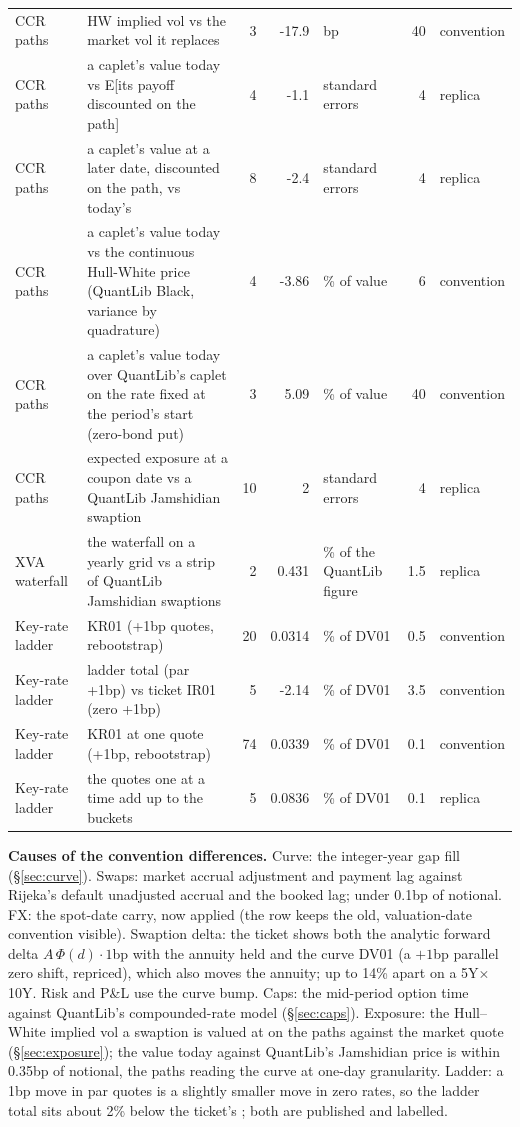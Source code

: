 \documentclass[11pt,a4paper]{article}
\newcommand{\code}[1]{\ifmmode\text{\small\texttt{\detokenize{#1}}}\else{\small\path{#1}}\fi}
\begin{document}
{\begin{longtable}{>{\raggedright\arraybackslash}p{2.2cm}>{\raggedright\arraybackslash}p{4.6cm} r r >{\raggedright\arraybackslash}p{1.8cm} r >{\raggedright\arraybackslash}p{1.8cm}}
CCR paths & HW implied vol vs the market vol it replaces & 3 & -17.9 & bp & 40 & convention \\
CCR paths & a caplet's value today vs E[its payoff discounted on the path] & 4 & -1.1 & standard errors & 4 & replica \\
CCR paths & a caplet's value at a later date, discounted on the path, vs today's & 8 & -2.4 & standard errors & 4 & replica \\
CCR paths & a caplet's value today vs the continuous Hull-White price (QuantLib Black, variance by quadrature) & 4 & -3.86 & \% of value & 6 & convention \\
CCR paths & a caplet's value today over QuantLib's caplet on the rate fixed at the period's start (zero-bond put) & 3 & 5.09 & \% of value & 40 & convention \\
CCR paths & expected exposure at a coupon date vs a QuantLib Jamshidian swaption & 10 & 2 & standard errors & 4 & replica \\
XVA waterfall & the waterfall on a yearly grid vs a strip of QuantLib Jamshidian swaptions & 2 & 0.431 & \% of the QuantLib figure & 1.5 & replica \\
Key-rate ladder & KR01 (+1bp quotes, rebootstrap) & 20 & 0.0314 & \% of DV01 & 0.5 & convention \\
Key-rate ladder & ladder total (par +1bp) vs ticket IR01 (zero +1bp) & 5 & -2.14 & \% of DV01 & 3.5 & convention \\
Key-rate ladder & KR01 at one quote (+1bp, rebootstrap) & 74 & 0.0339 & \% of DV01 & 0.1 & convention \\
Key-rate ladder & the quotes one at a time add up to the buckets & 5 & 0.0836 & \% of DV01 & 0.1 & replica \\
\bottomrule
\end{longtable}}

\textbf{Causes of the convention differences.} Curve: the integer-year gap fill (\S\ref{sec:curve}). Swaps: market accrual adjustment and payment lag against Rijeka's default unadjusted accrual and the booked lag; under 0.1bp of notional. FX: the spot-date carry, now applied (the row keeps the old, valuation-date convention visible). Swaption delta: the ticket shows both the analytic forward delta $A\,\Phi(d)\cdot 1$bp with the annuity held and the curve DV01 (a $+1$bp parallel zero shift, repriced), which also moves the annuity; up to 14\% apart on a 5Y$\times$10Y. Risk and P\&L use the curve bump. Caps: the mid-period option time against QuantLib's compounded-rate model (\S\ref{sec:caps}). Exposure: the Hull--White implied vol a swaption is valued at on the paths against the market quote (\S\ref{sec:exposure}); the value today against QuantLib's Jamshidian price is within 0.35bp of notional, the paths reading the curve at one-day granularity. Ladder: a 1bp move in par quotes is a slightly smaller move in zero rates, so the ladder total sits about 2\% below the ticket's \code{IR01}; both are published and labelled.
\end{document}

